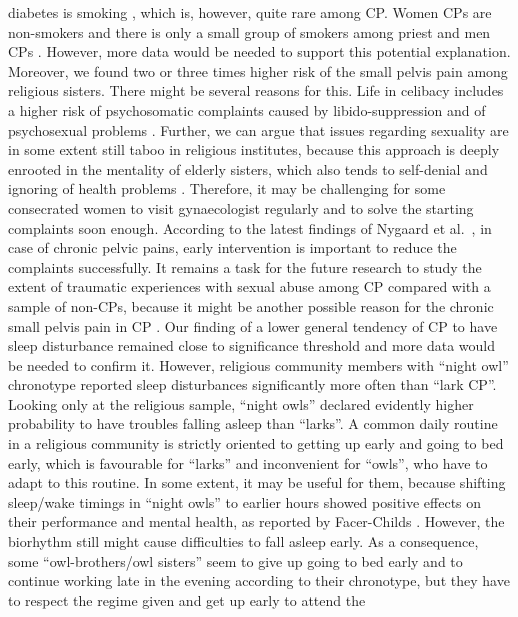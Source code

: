 \documentclass[ijerph,article,accept,moreauthors,pdftex]{mdpi}
\begin{document}
diabetes is smoking \citep{brovz2020prevalence}, which is, however,
quite rare among CP. Women CPs are non-smokers \citep{butler1996trends}
and there is only a small group of smokers among priest and men CPs
\citep{stang2012cancer}. However, more data would be needed to support
this potential explanation. Moreover, we found two or three times higher
risk of the small pelvis pain among religious sisters. There might be
several reasons for this. Life in celibacy includes a higher risk of
psychosomatic complaints caused by libido-suppression and of
psychosexual problems \citep{baumann2019spiritual}. Further, we can
argue that issues regarding sexuality are in some extent still taboo in
religious institutes, because this approach is deeply enrooted in the
mentality of elderly sisters, which also tends to self-denial and
ignoring of health problems \citep{jakvsivcova2021sluzebnici}.
Therefore, it may be challenging for some consecrated women to visit
gynaecologist regularly and to solve the starting complaints soon
enough. According to the latest findings of Nygaard et
al.~\citep{nygaard2020baseline}, in case of chronic pelvic pains, early
intervention is important to reduce the complaints successfully. It
remains a task for the future research to study the extent of traumatic
experiences with sexual abuse among CP compared with a sample of
non-CPs, because it might be another possible reason for the chronic
small pelvis pain in CP \citep{heim1998abuse}. Our finding of a lower
general tendency of CP to have sleep disturbance remained close to
significance threshold and more data would be needed to confirm it.
However, religious community members with ``night owl'' chronotype
reported sleep disturbances significantly more often than ``lark CP''.
Looking only at the religious sample, ``night owls'' declared evidently
higher probability to have troubles falling asleep than ``larks''. A
common daily routine in a religious community is strictly oriented to
getting up early and going to bed early, which is favourable for
``larks'' and inconvenient for ``owls'', who have to adapt to this
routine. In some extent, it may be useful for them, because shifting
sleep/wake timings in ``night owls'' to earlier hours showed positive
effects on their performance and mental health, as reported by
Facer-Childs \citep{facer2019resetting}. However, the biorhythm still
might cause difficulties to fall asleep early. As a consequence, some
``owl-brothers/owl sisters'' seem to give up going to bed early and to
continue working late in the evening according to their chronotype, but
they have to respect the regime given and get up early to attend the
\end{document}
